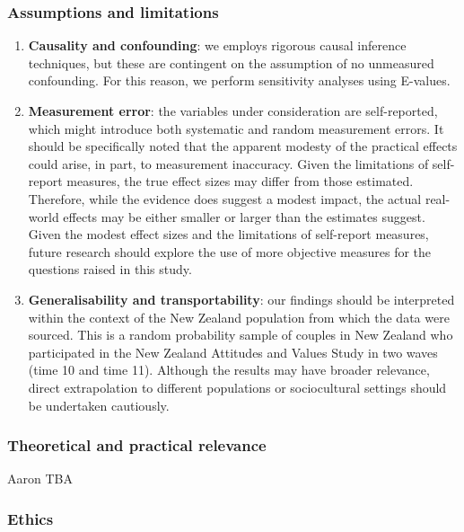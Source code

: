 \documentclass[
  singlecolumn]{article}
\begin{document}
\subsubsection{Assumptions and
limitations}\label{assumptions-and-limitations}

\begin{enumerate}
\def\labelenumi{\arabic{enumi}.}
\item
  \textbf{Causality and confounding}: we employs rigorous causal
  inference techniques, but these are contingent on the assumption of no
  unmeasured confounding. For this reason, we perform sensitivity
  analyses using E-values.
\item
  \textbf{Measurement error}: the variables under consideration are
  self-reported, which might introduce both systematic and random
  measurement errors. It should be specifically noted that the apparent
  modesty of the practical effects could arise, in part, to measurement
  inaccuracy. Given the limitations of self-report measures, the true
  effect sizes may differ from those estimated. Therefore, while the
  evidence does suggest a modest impact, the actual real-world effects
  may be either smaller or larger than the estimates suggest. Given the
  modest effect sizes and the limitations of self-report measures,
  future research should explore the use of more objective measures for
  the questions raised in this study.
\item
  \textbf{Generalisability and transportability}: our findings should be
  interpreted within the context of the New Zealand population from
  which the data were sourced. This is a random probability sample of
  couples in New Zealand who participated in the New Zealand Attitudes
  and Values Study in two waves (time 10 and time 11). Although the
  results may have broader relevance, direct extrapolation to different
  populations or sociocultural settings should be undertaken cautiously.
\end{enumerate}

\subsubsection{Theoretical and practical
relevance}\label{theoretical-and-practical-relevance}

Aaron TBA

\newpage{}

\subsubsection{Ethics}\label{ethics}
\end{document}
